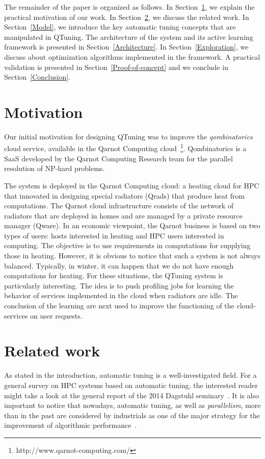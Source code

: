\documentclass[10pt, conference, compsocconf]{IEEEtran}
\begin{document}
The remainder of the paper is organized as follows. In Section~\ref{Motivation}, we explain the practical motivation of
our work. In Section~\ref{Related}, we discuss the related work.
In Section~\ref{Model}, we introduce the key automatic tuning concepts that are manipulated in QTuning.
The architecture of the system and its active learning framework is presented in Section~\ref{Architecture}.
In Section~\ref{Exploration}, we discuss about optimization algorithms implemented in the framework.
A practical validation is presented in Section~\ref{Proof-of-concept} and we conclude in
Section~\ref{Conclusion}.


\section{Motivation} \label{Motivation}

Our initial motivation for designing QTuning was to improve the {\it qombinatorics}
cloud service, available in the Qarnot Computing cloud~\footnote{http://www.qarnot-computing.com/}. Qombinatorics is a SaaS
developed by the Qarnot Computing Research team for the parallel resolution of NP-hard problems.

The system is deployed in the Qarnot Computing cloud: a heating cloud for HPC that innovated in designing special radiators (Qrads) that produce heat from computations. The Qarnot cloud infrastructure consists of the network of radiators that are deployed in homes and are managed by a private resource manager (Qware).
In an economic viewpoint, the Qarnot business is based on two types of users: hosts interested in heating and HPC users interested
in computing. The objective is to use requirements in computations for supplying those in heating.
However, it is obvious to notice that such a system is not always balanced. Typically, in winter, it can happen that we
do not have enough computations for heating. For these situations, the QTuning system is particularly interesting.
The idea is to push profiling jobs for learning the behavior of services implemented in the cloud when radiators are idle.
The conclusion of the learning are next used to improve the functioning of the cloud-services on user requests.




\section{Related work} \label{Related}

As stated in the introduction, automatic tuning  is a well-investigated field. For a general survey on HPC systems based on
automatic tuning, the interested reader might take a look at the general report of the 2014 Dagstuhl seminary~\cite{benkner_et_al:DR:2014:4423}.
It is also important to notice that nowadays, automatic tuning, as well as  {\it parallelism}, more than in the past
are considered by industrials as one of the major strategy for the improvement of algorithmic performance~\cite{Oracle}.
\end{document}
